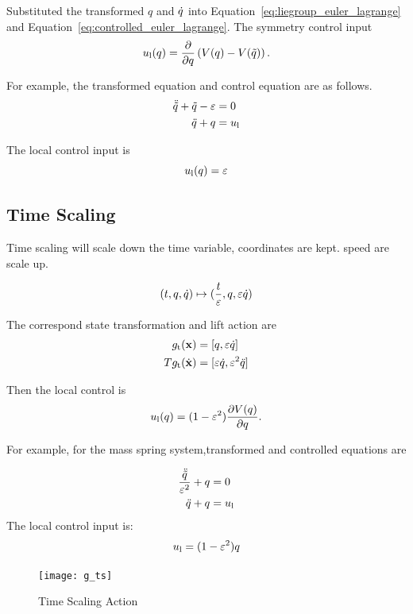 Substituted the transformed $q$ and $\dot{q}$ into Equation~\ref{eq:liegroup_euler_lagrange} and Equation~\ref{eq:controlled_euler_lagrange}.
The symmetry control input
\begin{equation}
u_{\mathrm{l}}(q) = \frac{\partial}{\partial q} \left(V(q)-V(\tilde{q}) \right).
\end{equation}

For example, the transformed equation and control equation are as follows.
\begin{align}
\ddot{\tilde{q}}+\tilde{q}-\varepsilon&=0 \nonumber \\
\ddot{q}+q&=u_{\mathrm{l}} \nonumber
\end{align}

The local control input is
\[
u_{\mathrm{l}}(q)=\varepsilon
\]




\subsection*{Time Scaling}

Time scaling will scale down the time variable, coordinates are kept. speed are scale up.

\[
(t,q,\dot{q}) \mapsto (\frac{t}{\varepsilon},q,\varepsilon \dot{q})
\]

The correspond state transformation and lift action are
\begin{align}
g_{\mathrm{t}}(\mathbf{x})&=[q,\varepsilon \dot{q}] \nonumber \\
Tg_{\mathrm{t}}(\dot{\mathbf{x}})&=[\varepsilon \dot{q},\varepsilon^2 \ddot{q}]\nonumber
\end{align}

Then the local control is 
\begin{equation}
u_{\mathrm{l}}(q) = (1-\varepsilon^2) \frac{\partial V(q)}{\partial q}.
\end{equation}

For example, for the mass spring system,transformed and controlled equations are

\begin{align}
\frac{\ddot{\tilde{q}}}{\varepsilon^2}+q&=0 \nonumber \\
\ddot{q}+q&=u_{\mathrm{l}} \nonumber
\end{align}
The local control input is:
\[
u_{\mathrm{l}}=(1-\varepsilon^2)q
\]

\begin{figure}[!htbp]
  \begin{center}
    \texttt{[image: g\_ts]}
	 \caption{Time Scaling Action}
    \label{fig:gts}
\end{center}
\end{figure}


